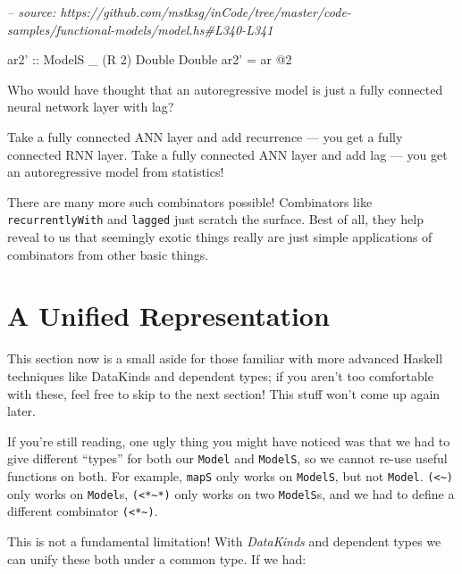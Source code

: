\documentclass[]{article}
\newenvironment{Shaded}{}{}
\newcommand{\CommentTok}[1]{\textcolor[rgb]{0.38,0.63,0.69}{\textit{#1}}}
\newcommand{\DataTypeTok}[1]{\textcolor[rgb]{0.56,0.13,0.00}{#1}}
\newcommand{\DecValTok}[1]{\textcolor[rgb]{0.25,0.63,0.44}{#1}}
\newcommand{\FunctionTok}[1]{\textcolor[rgb]{0.02,0.16,0.49}{#1}}
\newcommand{\NormalTok}[1]{#1}
\newcommand{\OtherTok}[1]{\textcolor[rgb]{0.00,0.44,0.13}{#1}}
\begin{document}
\begin{Shaded}
\begin{Highlighting}[]
\CommentTok{-- source: https://github.com/mstksg/inCode/tree/master/code-samples/functional-models/model.hs#L340-L341}

\OtherTok{ar2' ::} \DataTypeTok{ModelS}\NormalTok{ _ (}\DataTypeTok{R} \DecValTok{2}\NormalTok{) }\DataTypeTok{Double} \DataTypeTok{Double}
\NormalTok{ar2' }\FunctionTok{=}\NormalTok{ ar }\FunctionTok{@}\DecValTok{2}
\end{Highlighting}
\end{Shaded}

Who would have thought that an autoregressive model is just a fully connected
neural network layer with lag?

Take a fully connected ANN layer and add recurrence --- you get a fully
connected RNN layer. Take a fully connected ANN layer and add lag --- you get an
autoregressive model from statistics!

There are many more such combinators possible! Combinators like
\texttt{recurrentlyWith} and \texttt{lagged} just scratch the surface. Best of
all, they help reveal to us that seemingly exotic things really are just simple
applications of combinators from other basic things.

\hypertarget{a-unified-representation}{%
\section{A Unified Representation}\label{a-unified-representation}}

This section now is a small aside for those familiar with more advanced Haskell
techniques like DataKinds and dependent types; if you aren't too comfortable
with these, feel free to skip to the next section! This stuff won't come up
again later.

If you're still reading, one ugly thing you might have noticed was that we had
to give different ``types'' for both our \texttt{Model} and \texttt{ModelS}, so
we cannot re-use useful functions on both. For example, \texttt{mapS} only works
on \texttt{ModelS}, but not \texttt{Model}.
\texttt{(\textless{}\textasciitilde{})} only works on \texttt{Model}s,
\texttt{(\textless{}*\textasciitilde{}*)} only works on two \texttt{ModelS}s,
and we had to define a different combinator
\texttt{(\textless{}*\textasciitilde{})}.

This is not a fundamental limitation! With \emph{DataKinds} and dependent types
we can unify these both under a common type. If we had:
\end{document}
